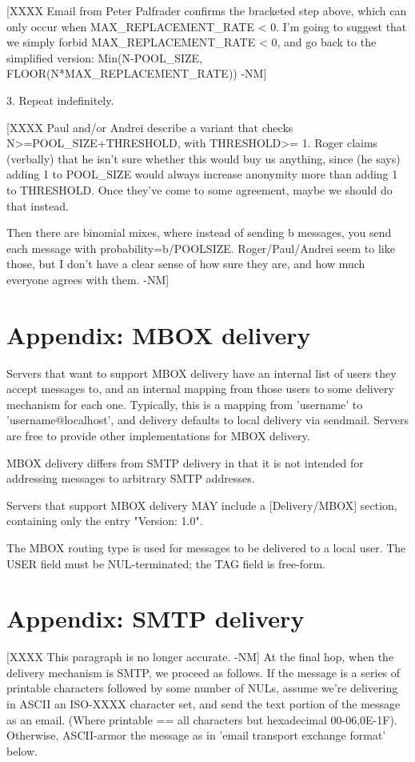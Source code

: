 [XXXX Email from Peter Palfrader confirms the bracketed step above,
 which can only occur when MAX_REPLACEMENT_RATE < 0.  I'm going to
 suggest that we simply forbid MAX_REPLACEMENT_RATE < 0, and go back
 to the simplified version:
     Min(N-POOL_SIZE, FLOOR(N*MAX_REPLACEMENT_RATE)) -NM]

3. Repeat indefinitely.

[XXXX 
   Paul and/or Andrei describe a variant that checks N>=POOL_SIZE+THRESHOLD, 
   with THRESHOLD>= 1.  Roger claims (verbally) that he isn't sure whether
   this would buy us anything, since (he says) adding 1 to POOL_SIZE would
   always increase anonymity more than adding 1 to THRESHOLD.  Once they've
   come to some agreement, maybe we should do that instead.

   Then there are binomial mixes, where instead of sending b messages,
   you send each message with probability=b/POOLSIZE.  Roger/Paul/Andrei
   seem to like those, but I don't have a clear sense of how sure they are,
   and how much everyone agrees with them. -NM]
  
\section{Appendix: MBOX delivery}

Servers that want to support MBOX delivery have an internal list of
users they accept messages to, and an internal mapping from those
users to some delivery mechanism for each one.  Typically, this is a
mapping from 'username' to 'username@localhost', and delivery defaults
to local delivery via sendmail.  Servers are free to provide other
implementations for MBOX delivery.

MBOX delivery differs from SMTP delivery in that it is not intended
for addressing messages to arbitrary SMTP addresses.

Servers that support MBOX delivery MAY include a [Delivery/MBOX]
section, containing only the entry "Version: 1.0".

The MBOX routing type is used for messages to be delivered to a local
user.  The USER field must be NUL-terminated; the TAG field is
free-form. 

\section{Appendix: SMTP delivery}

[XXXX This paragraph is no longer accurate. -NM]
At the final hop, when the delivery mechanism is SMTP, we proceed as
follows.  If the message is a series of printable characters followed
by some number of NULs, assume we're delivering in ASCII an ISO-XXXX
character set, and send the text portion of the message as an email.
(Where printable == {all characters but hexadecimal 00-06,0E-1F}).
Otherwise, ASCII-armor the message as in 'email transport exchange
format' below.

